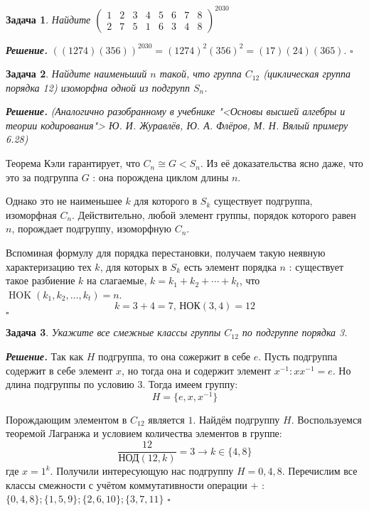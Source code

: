 \documentclass[12pt]{article}
\newtheorem{problem}{Задача}
\newenvironment{solution}[1][\it{Решение}]{\textbf{#1. } }{$\square$}
\begin{document}
\begin{problem}
Найдите $\left(\begin{array}{llllllll}1 & 2 & 3 & 4 & 5 & 6 & 7 & 8 \\ 2 & 7 & 5 & 1 & 6 & 3 & 4 & 8\end{array}\right)^{2030}$
\end{problem}

\begin{solution}
$((1274)(356))^{2030}=(1274)^2(356)^2=(17)(24)(365)$.
\end{solution}

\newpage
\begin{problem}
Найдите наименьший $n$ такой, что группа $C_{12}$ (циклическая группа порядка 12) изоморфна одной из подгрупп $S_n$.
\end{problem}

\begin{solution}
    \textit{(Аналогично разобранному в учебнике "<Основы высшей алгебры и теории кодирования"> Ю. И. Журавлёв, Ю. А. Флёров, М. Н. Вялый примеру 6.28)}

    
    Теорема Кэли гарантирует, что $C_n \cong G<S_n$. Из её доказательства ясно даже, что это за подгруппа $G$ : она порождена циклом длины $n$.

    Однако это не наименьшее $k$ для которого в $S_k$ существует подгруппа, изоморфная $C_n$. Действительно, любой элемент группы, порядок которого равен $n$, порождает подгруппу, изоморфную $C_n$.
    
    Вспоминая формулу для порядка перестановки, получаем такую неявную характеризацию тех $k$, для которых в $S_k$ есть элемент порядка $n$ : существует такое разбиение $k$ на слагаемые, $k=k_1+k_2+\cdots+k_t$, что $\operatorname{HOK}\left(k_1, k_2, \ldots, k_t\right)=n$. 
    $$k = 3 + 4 = 7\text{, НОК}(3, 4) = 12$$
\end{solution}

\begin{problem}
Укажите все смежные классы группы $C_{12}$ по подгруппе порядка 3.
\end{problem}
\begin{solution}
Так как $H$ подгруппа, то она сожержит в себе $e$. Пусть подгруппа содержит в себе элемент $x$, но тогда она и содержит элемент $x^{-1} : xx^{-1} = e$. Но длина подгруппы по условию $3$. Тогда имеем группу:
$$
H = \{e, x, x^{-1}\}
$$

Порождающим элементом в $C_{12}$ является $1$. Найдём подгруппу $H$. Воспользуемся теоремой Лагранжа и условием количества элементов в группе:
$$\frac{12}{\text{НОД}(12, k)}=3 \longrightarrow k \in\{4,8\}$$
где $x = 1^k$. Получили интересующую нас подгруппу $H = {0, 4, 8}$. Перечислим все классы смежности с учётом коммутативности операции $+$ : $\{0, 4, 8\}; \{1, 5, 9\}; \{2, 6, 10\}; \{3, 7, 11\}$
\end{solution}
\end{document}
